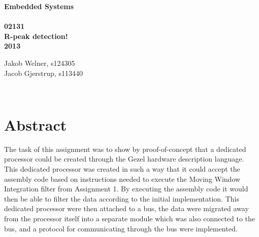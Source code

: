 \documentclass[12pt,a4paper]{article}
\begin{document}
\begin{titlepage}
	\begin{center}
		\vspace*{13\baselineskip}
		\huge
		\bfseries
		Embedded Systems\\ 
		\ \\
		02131 \\[5\baselineskip]

		\normalfont
		\Large
		R-peak detection!\\	
		2013

		\small
		\vfill
	\end{center}	
	\begin{flushleft}
		Jakob Welner, s124305\\
	 	Jacob Gjerstrup, s113440\\
	\end{flushleft}
\end{titlepage}

\ \\
\section*{Abstract}
The task of this assignment was to show by proof-of-concept that a dedicated processor could be created through the Gezel hardware description language. This dedicated processor was created in such a way that it could accept the assembly code based on instructions needed to execute the Moving Window Integration filter from Assignment 1. By executing the assembly code it would then be able to filter the data according to the initial implementation. This dedicated processor were then attached to a bus, the data were migrated away from the processor itself into a separate module which was also connected to the bus, and a protocol for communicating through the bus were implemented.

\thispagestyle{empty} 
\newpage

\tableofcontents
\thispagestyle{empty} 
\newpage

\setcounter{page}{1}

\ \\
\end{document}
